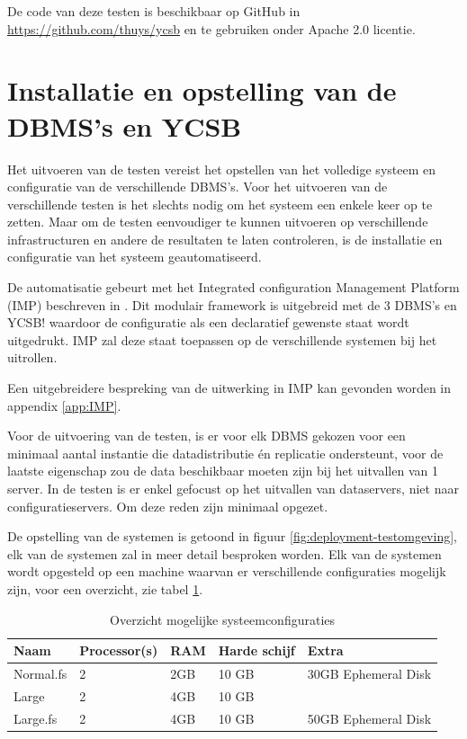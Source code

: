 De code van deze testen is beschikbaar op GitHub in \url{https://github.com/thuys/ycsb} en te gebruiken onder Apache 2.0 licentie. 

\section{Installatie en opstelling van de DBMS's en YCSB}
Het uitvoeren van de testen vereist het opstellen van het volledige systeem en configuratie van de verschillende DBMS's. Voor het uitvoeren van de verschillende testen is het slechts nodig om het systeem een enkele keer op te zetten. Maar om de testen eenvoudiger te kunnen uitvoeren op verschillende infrastructuren en andere de resultaten te laten controleren, is de installatie en configuratie van het systeem geautomatiseerd. 

De automatisatie gebeurt met het Integrated configuration Management Platform (\gls{IMP}) beschreven in \cite{KULeuven-453199}. Dit modulair framework is uitgebreid met de 3 DBMS's en YCSB! waardoor de configuratie als een declaratief gewenste staat wordt uitgedrukt. \gls{IMP} zal deze staat toepassen op de verschillende systemen bij het uitrollen. 

Een uitgebreidere bespreking van de uitwerking in IMP kan gevonden worden in appendix \ref{app:IMP}. 

Voor de uitvoering van de testen, is er voor elk DBMS gekozen voor een minimaal aantal instantie die datadistributie én replicatie ondersteunt, voor de laatste eigenschap zou de data beschikbaar moeten zijn bij het uitvallen van 1 server. In de testen is er enkel gefocust op het uitvallen van dataservers, niet naar configuratieservers. Om deze reden zijn minimaal opgezet. 

De opstelling van de systemen is getoond in figuur \ref{fig:deployment-testomgeving}, elk van de systemen zal in meer detail besproken worden. Elk van de systemen wordt opgesteld op een machine waarvan er verschillende configuraties mogelijk zijn, voor een overzicht, zie tabel \ref{table:systeemconfiguraties}. 
\begin{table}[h!]
	\centering
	\begin{tabular}{l| l l l l}
	\textbf{Naam} & \textbf{Processor(s)} & \textbf{RAM} & \textbf{Harde schijf} & \textbf{Extra} \\
	\hline
	Normal.fs & 2 & 2GB &  10 GB & 30GB Ephemeral Disk \\ 
	Large & 2 & 4GB &  10 GB & \\
	Large.fs & 2 & 4GB &  10 GB & 50GB Ephemeral Disk\\
	\end{tabular}
	\caption{Overzicht mogelijke systeemconfiguraties}
	\label{table:systeemconfiguraties}
\end{table}

